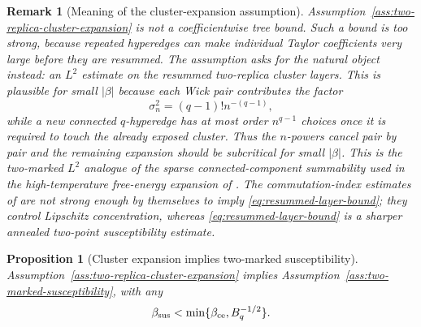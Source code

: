 \documentclass[11pt]{article}
\newtheorem{proposition}[theorem]{Proposition}
\newtheorem{remark}[theorem]{Remark}
\begin{document}
\begin{remark}[Meaning of the cluster-expansion assumption]
  Assumption~\ref{ass:two-replica-cluster-expansion} is not a coefficientwise
  tree bound.  Such a bound is too strong, because repeated hyperedges can
  make individual Taylor coefficients very large before they are resummed.  The
  assumption asks for the natural object instead: an $L^2$ estimate on the
  resummed two-replica cluster layers.  This is plausible for small $|\beta|$
  because each Wick pair contributes the factor
  \begin{equation}\label{eq:sigma-pair-cancellation}
    \sigma_n^2=(q-1)!n^{-(q-1)},
  \end{equation}
  while a new connected $q$-hyperedge has at most order $n^{q-1}$ choices once
  it is required to touch the already exposed cluster.  Thus the $n$-powers
  cancel pair by pair and the remaining expansion should be subcritical for
  small $|\beta|$.  This is the two-marked $L^2$ analogue of the sparse
  connected-component summability used in the high-temperature free-energy
  expansion of \cite{GPSZ2026}.  The commutation-index estimates of
  \cite{ACKK2025} are not strong enough by themselves to imply
  \eqref{eq:resummed-layer-bound}; they control Lipschitz concentration,
  whereas \eqref{eq:resummed-layer-bound} is a sharper annealed two-point
  susceptibility estimate.
\end{remark}

\begin{proposition}[Cluster expansion implies two-marked susceptibility]
  \label{prop:cluster-expansion-to-susceptibility}
  Assumption~\ref{ass:two-replica-cluster-expansion} implies
  Assumption~\ref{ass:two-marked-susceptibility}, with any
  \begin{equation}\label{eq:beta-sus-from-ce}
    \beta_{\rm sus}<\min\{\beta_{\rm ce},B_q^{-1/2}\}.
  \end{equation}
\end{proposition}
\end{document}
